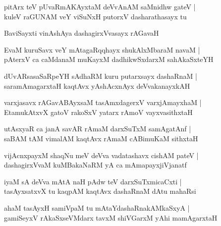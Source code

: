 \begin{shloka}
pitArx teV pUvaRmAKAyxtaM deVvAnAM saMnidhw gateV |\\
kuleV raGUNAM veY viSuNxH putorxV dasharathasayx tu 
\end{shloka}

\begin{shloka}
BaviSayxti vinAshAya dashagirxVvasayx rAGavaH
\end{shloka}

\begin{shloka}
EvaM kuruSavx veY mAtagaRqqhayx shukAlxMbaraM navaM |\\
pAterxV ca caMdanaM muKayxM dadhikwSxdarxM sahAkaSxteYH
\end{shloka}

\begin{shloka}
dUvARsasaSaRpeYH sAdhaRM kuru putarxsayx dashaRnaM |\\
saramAmagarxtaH kaqtAvx yAshAcxnAyx deVvakanayxkAH 
\end{shloka}

\begin{shloka}
varxjasavx rAGavABAyxsaM tasAmxdagerxV varxjAmayxhaM |\\
EtamukAtxvX gatoV rakoSxV yatarx rAmoV vayxvasithxtaH
\end{shloka}

\begin{shloka}
utAsxyaR ca janA\R{} savAR\R{} rAmaM darxSuTxM samAgatAnf |\\
saBAM tAM vimalAM kaqtAvx rAmaM cABimuKaM sithxtaH 
\end{shloka}

\begin{shloka}
vijAcnxpayxM shaqNu meV deVva vadatashavx cishAM pateV |\\
dashagirxVvaM kuMBakaNaRM yA ca mAmapayxjiVjanatf 
\end{shloka}

\begin{shloka}
iyaM sA deVva mAtA naH pAdw teV darxSuTxmicaCxti |\\
tasAyxsatxvX tu kaqpAM kaqtAvx dashaRnaM dAtu mahaRsi
\end{shloka}

\begin{shloka}
ahaM tasAyxH samiVpaM tu mAtaYdashaRnakAMkaSxyA |\\
gamiSeyxV rAkaSxseVMdarx tavxM shiVGarxM yAhi mamAgarxtaH 
\end{shloka}

